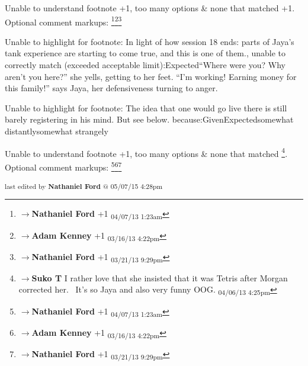 	Unable to understand footnote +1, too many options & none that matched +1. Optional comment markups: \footnote{$\rightarrow$\textbf{Nathaniel Ford }+1 \textsubscript{04/07/13 1:23am}}\footnote{$\rightarrow$\textbf{Adam Kenney }+1 \textsubscript{03/16/13 4:22pm}}\footnote{$\rightarrow$\textbf{Nathaniel Ford }+1 \textsubscript{03/21/13 9:29pm}} 

	Unable to highlight for footnote: In light of how session 18 ends: parts of Jaya's tank experience are starting to come true, and this is one of them., unable to correctly match (exceeded acceptable limit):Expected“Where were you?  Why aren’t you here?” she yells, getting to her feet.
“I’m working!  Earning money for this family!” says Jaya, her defensiveness turning to anger.

	Unable to highlight for footnote: The idea that one would go live there is still barely registering in his mind.  But see below. because:GivenExpectedsomewhat distantlysomewhat strangely

	Unable to understand footnote +1, too many options & none that matched \footnote{$\rightarrow$\textbf{Suko T }I rather love that she insisted that it was Tetris after Morgan corrected her.  It's so Jaya and also very funny OOG. \textsubscript{04/06/13 4:25pm}}. Optional comment markups: \footnote{$\rightarrow$\textbf{Nathaniel Ford }+1 \textsubscript{04/07/13 1:23am}}\footnote{$\rightarrow$\textbf{Adam Kenney }+1 \textsubscript{03/16/13 4:22pm}}\footnote{$\rightarrow$\textbf{Nathaniel Ford }+1 \textsubscript{03/21/13 9:29pm}} 


\fi

\vspace{\fill}

\begin{flushright}
\textsubscript{last edited by \textbf{Nathaniel Ford} @ 05/07/15 4:28pm}
\end{flushright}

